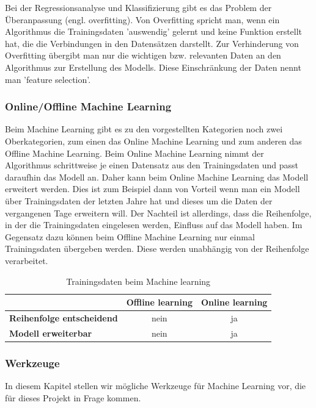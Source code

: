 Bei der Regressionsanalyse und Klassifizierung gibt es das Problem der Überanpassung (engl. overfitting). Von Overfitting spricht man, wenn ein Algorithmus die Trainingsdaten 'auswendig' gelernt und keine Funktion erstellt hat, die die Verbindungen in den Datensätzen darstellt. Zur Verhinderung von Overfitting übergibt man nur die wichtigen bzw. relevanten Daten an den Algorithmus zur Erstellung des Modells. Diese Einschränkung der Daten nennt man 'feature selection'.

\subsubsection{Online/Offline Machine Learning}

Beim Machine Learning gibt es zu den vorgestellten Kategorien noch zwei Oberkategorien, zum einen das Online Machine Learning und zum anderen das Offline Machine Learning. Beim Online Machine Learning nimmt der Algorithmus schrittweise je einen Datensatz aus den Trainingsdaten und passt daraufhin das Modell an. Daher kann beim Online Machine Learning das Modell erweitert werden. Dies ist zum Beispiel dann von Vorteil wenn man ein Modell über Trainingsdaten der letzten Jahre hat und dieses um die Daten der vergangenen Tage erweitern will. Der Nachteil ist allerdings, dass die Reihenfolge, in der die Trainingsdaten eingelesen werden, Einfluss auf das Modell haben. Im Gegensatz dazu können beim Offline Machine Learning nur einmal Trainingsdaten übergeben werden. Diese werden unabhängig von der Reihenfolge verarbeitet.

\begin{table}[H]
	\centering
\begin{tabular}{l|c|c} 
	\textbf{} & \textbf{Offline learning} & \textbf{Online learning}  \\  
	\hline \textbf{Reihenfolge entscheidend} & nein & ja \\
	\hline \textbf{Modell erweiterbar} & nein & ja 
	\vspace{0.3cm} 
\end{tabular} 
\caption{Trainingsdaten beim Machine learning}
\label{tab:MachineLearningTrainingData}
\end{table}
 
\subsubsection{Werkzeuge}
In diesem Kapitel stellen wir mögliche Werkzeuge für Machine Learning vor, die für dieses Projekt in Frage kommen.


